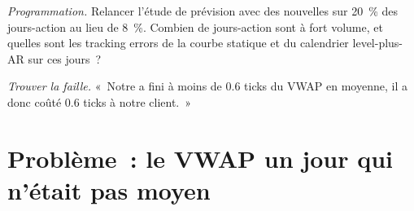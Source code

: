 \begin{exercise}[$\star\star\star$]\label{exo:mx:benchmark-algorithms:7}
\emph{Programmation.} Relancer l'étude de prévision avec des nouvelles sur 20~\% des jours-action au lieu de 8~\%. Combien de jours-action sont à fort volume, et quelles sont les
tracking errors de la courbe statique et du calendrier level-plus-AR sur ces jours~?
\end{exercise}

\begin{exercise}[$\star\star\star$]\label{exo:mx:benchmark-algorithms:8}
\emph{Trouver la faille.} «~Notre  a fini à moins de 0.6 ticks du VWAP en moyenne, il a donc coûté 0.6 ticks à notre client.~»
\end{exercise}

\section{Problème~: le VWAP un jour qui n'était pas moyen}

